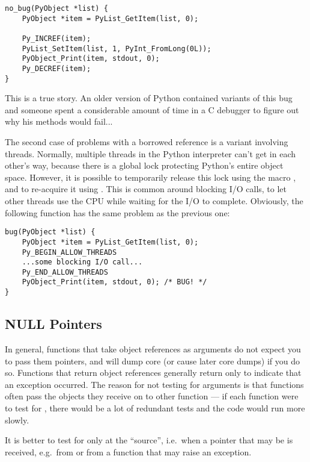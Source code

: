 \documentclass{manual}
\begin{document}
\begin{verbatim}
no_bug(PyObject *list) {
    PyObject *item = PyList_GetItem(list, 0);

    Py_INCREF(item);
    PyList_SetItem(list, 1, PyInt_FromLong(0L));
    PyObject_Print(item, stdout, 0);
    Py_DECREF(item);
}
\end{verbatim}

This is a true story.  An older version of Python contained variants
of this bug and someone spent a considerable amount of time in a C
debugger to figure out why his  methods would fail...

The second case of problems with a borrowed reference is a variant
involving threads.  Normally, multiple threads in the Python
interpreter can't get in each other's way, because there is a global
lock protecting Python's entire object space.  However, it is possible
to temporarily release this lock using the macro
, and to re-acquire it using
.  This is common around blocking I/O
calls, to let other threads use the CPU while waiting for the I/O to
complete.  Obviously, the following function has the same problem as
the previous one:

\begin{verbatim}
bug(PyObject *list) {
    PyObject *item = PyList_GetItem(list, 0);
    Py_BEGIN_ALLOW_THREADS
    ...some blocking I/O call...
    Py_END_ALLOW_THREADS
    PyObject_Print(item, stdout, 0); /* BUG! */
}
\end{verbatim}


\subsection{NULL Pointers
            \label{nullPointers}}

In general, functions that take object references as arguments do not
expect you to pass them \NULL{} pointers, and will dump core (or
cause later core dumps) if you do so.  Functions that return object
references generally return \NULL{} only to indicate that an
exception occurred.  The reason for not testing for \NULL{}
arguments is that functions often pass the objects they receive on to
other function --- if each function were to test for \NULL{},
there would be a lot of redundant tests and the code would run more
slowly.

It is better to test for \NULL{} only at the ``source'', i.e.\ when a
pointer that may be \NULL{} is received, e.g.\ from
 or from a function that may raise an exception.
\end{document}
